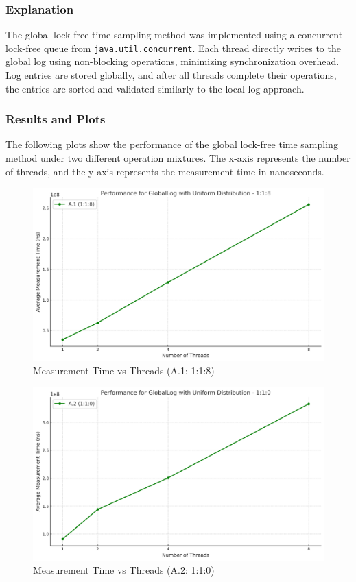 \documentclass{article}
\begin{document}
\subsubsection{Explanation}
The global lock-free time sampling method was implemented using a concurrent lock-free queue from \texttt{java.util.concurrent}. Each thread directly writes to the global log using non-blocking operations, minimizing synchronization overhead. Log entries are stored globally, and after all threads complete their operations, the entries are sorted and validated similarly to the local log approach.

\subsubsection{Results and Plots}

The following plots show the performance of the global lock-free time sampling method under two different operation mixtures. The x-axis represents the number of threads, and the y-axis represents the measurement time in nanoseconds.

\begin{figure}[H]
    \centering
    \includegraphics[width=\textwidth]{LaTex/images/Lab 3 2.5.2.1.png}
    \caption{Measurement Time vs Threads (A.1: 1:1:8)}
    \label{fig:global-log-1-1-8}
\end{figure}

\begin{figure}[H]
    \centering
    \includegraphics[width=\textwidth]{LaTex/images/Lab 3 2.5.2.2.png}
    \caption{Measurement Time vs Threads (A.2: 1:1:0)}
    \label{fig:global-log-1-1-0}
\end{figure}
\end{document}

